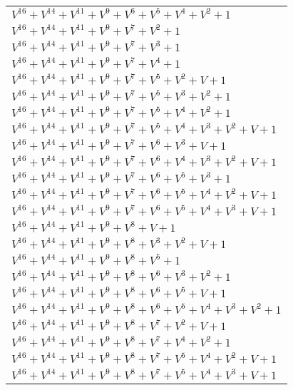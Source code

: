 \documentclass[12pt]{article}
\begin{document}
\begin{adjustwidth}{-4cm}{}
\begin{center}
\begin{longtable}{|l|}
$V^{16}  +V^{14}  +V^{11}  +V^{9}  +V^{6}  +V^{5}  +V^{4}  +V^{2}  + 1$ \\
$V^{16}  +V^{14}  +V^{11}  +V^{9}  +V^{7}  +V^{2}  + 1$ \\
$V^{16}  +V^{14}  +V^{11}  +V^{9}  +V^{7}  +V^{3}  + 1$ \\
$V^{16}  +V^{14}  +V^{11}  +V^{9}  +V^{7}  +V^{4}  + 1$ \\
$V^{16}  +V^{14}  +V^{11}  +V^{9}  +V^{7}  +V^{5}  +V^{2}  + V + 1$ \\
$V^{16}  +V^{14}  +V^{11}  +V^{9}  +V^{7}  +V^{5}  +V^{3}  +V^{2}  + 1$ \\
$V^{16}  +V^{14}  +V^{11}  +V^{9}  +V^{7}  +V^{5}  +V^{4}  +V^{2}  + 1$ \\
$V^{16}  +V^{14}  +V^{11}  +V^{9}  +V^{7}  +V^{5}  +V^{4}  +V^{3}  +V^{2}  + V + 1$ \\
$V^{16}  +V^{14}  +V^{11}  +V^{9}  +V^{7}  +V^{6}  +V^{3}  + V + 1$ \\
$V^{16}  +V^{14}  +V^{11}  +V^{9}  +V^{7}  +V^{6}  +V^{4}  +V^{3}  +V^{2}  + V + 1$ \\
$V^{16}  +V^{14}  +V^{11}  +V^{9}  +V^{7}  +V^{6}  +V^{5}  +V^{3}  + 1$ \\
$V^{16}  +V^{14}  +V^{11}  +V^{9}  +V^{7}  +V^{6}  +V^{5}  +V^{4}  +V^{2}  + V + 1$ \\
$V^{16}  +V^{14}  +V^{11}  +V^{9}  +V^{7}  +V^{6}  +V^{5}  +V^{4}  +V^{3}  + V + 1$ \\
$V^{16}  +V^{14}  +V^{11}  +V^{9}  +V^{8}  + V + 1$ \\
$V^{16}  +V^{14}  +V^{11}  +V^{9}  +V^{8}  +V^{3}  +V^{2}  + V + 1$ \\
$V^{16}  +V^{14}  +V^{11}  +V^{9}  +V^{8}  +V^{5}  + 1$ \\
$V^{16}  +V^{14}  +V^{11}  +V^{9}  +V^{8}  +V^{6}  +V^{3}  +V^{2}  + 1$ \\
$V^{16}  +V^{14}  +V^{11}  +V^{9}  +V^{8}  +V^{6}  +V^{5}  + V + 1$ \\
$V^{16}  +V^{14}  +V^{11}  +V^{9}  +V^{8}  +V^{6}  +V^{5}  +V^{4}  +V^{3}  +V^{2}  + 1$ \\
$V^{16}  +V^{14}  +V^{11}  +V^{9}  +V^{8}  +V^{7}  +V^{2}  + V + 1$ \\
$V^{16}  +V^{14}  +V^{11}  +V^{9}  +V^{8}  +V^{7}  +V^{4}  +V^{2}  + 1$ \\
$V^{16}  +V^{14}  +V^{11}  +V^{9}  +V^{8}  +V^{7}  +V^{5}  +V^{4}  +V^{2}  + V + 1$ \\
$V^{16}  +V^{14}  +V^{11}  +V^{9}  +V^{8}  +V^{7}  +V^{5}  +V^{4}  +V^{3}  + V + 1$ \\

\end{longtable}
\end{center}
\end{adjustwidth}
\end{document}
